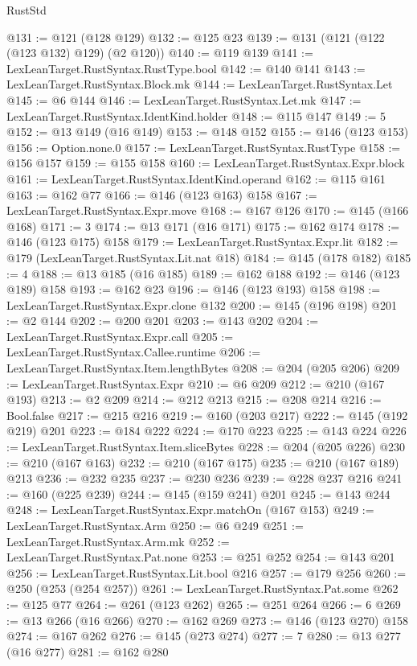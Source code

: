 \begin{lexlean}{RustStd}
\begin{coremodule}
@131 := @121 (@128 @129)
@132 := @125 @23
@139 := @131 (@121 (@122 (@123 @132) @129) (@2 @120))
@140 := @119 @139
@141 := LexLeanTarget.RustSyntax.RustType.bool
@142 := @140 @141
@143 := LexLeanTarget.RustSyntax.Block.mk
@144 := LexLeanTarget.RustSyntax.Let
@145 := @6 @144
@146 := LexLeanTarget.RustSyntax.Let.mk
@147 := LexLeanTarget.RustSyntax.IdentKind.holder
@148 := @115 @147
@149 := 5
@152 := @13 @149 (@16 @149)
@153 := @148 @152
@155 := @146 (@123 @153)
@156 := Option.none.{0}
@157 := LexLeanTarget.RustSyntax.RustType
@158 := @156 @157
@159 := @155 @158
@160 := LexLeanTarget.RustSyntax.Expr.block
@161 := LexLeanTarget.RustSyntax.IdentKind.operand
@162 := @115 @161
@163 := @162 @77
@166 := @146 (@123 @163) @158
@167 := LexLeanTarget.RustSyntax.Expr.move
@168 := @167 @126
@170 := @145 (@166 @168)
@171 := 3
@174 := @13 @171 (@16 @171)
@175 := @162 @174
@178 := @146 (@123 @175) @158
@179 := LexLeanTarget.RustSyntax.Expr.lit
@182 := @179 (LexLeanTarget.RustSyntax.Lit.nat @18)
@184 := @145 (@178 @182)
@185 := 4
@188 := @13 @185 (@16 @185)
@189 := @162 @188
@192 := @146 (@123 @189) @158
@193 := @162 @23
@196 := @146 (@123 @193) @158
@198 := LexLeanTarget.RustSyntax.Expr.clone @132
@200 := @145 (@196 @198)
@201 := @2 @144
@202 := @200 @201
@203 := @143 @202
@204 := LexLeanTarget.RustSyntax.Expr.call
@205 := LexLeanTarget.RustSyntax.Callee.runtime
@206 := LexLeanTarget.RustSyntax.Item.lengthBytes
@208 := @204 (@205 @206)
@209 := LexLeanTarget.RustSyntax.Expr
@210 := @6 @209
@212 := @210 (@167 @193)
@213 := @2 @209
@214 := @212 @213
@215 := @208 @214
@216 := Bool.false
@217 := @215 @216
@219 := @160 (@203 @217)
@222 := @145 (@192 @219) @201
@223 := @184 @222
@224 := @170 @223
@225 := @143 @224
@226 := LexLeanTarget.RustSyntax.Item.sliceBytes
@228 := @204 (@205 @226)
@230 := @210 (@167 @163)
@232 := @210 (@167 @175)
@235 := @210 (@167 @189) @213
@236 := @232 @235
@237 := @230 @236
@239 := @228 @237 @216
@241 := @160 (@225 @239)
@244 := @145 (@159 @241) @201
@245 := @143 @244
@248 := LexLeanTarget.RustSyntax.Expr.matchOn (@167 @153)
@249 := LexLeanTarget.RustSyntax.Arm
@250 := @6 @249
@251 := LexLeanTarget.RustSyntax.Arm.mk
@252 := LexLeanTarget.RustSyntax.Pat.none
@253 := @251 @252
@254 := @143 @201
@256 := LexLeanTarget.RustSyntax.Lit.bool @216
@257 := @179 @256
@260 := @250 (@253 (@254 @257))
@261 := LexLeanTarget.RustSyntax.Pat.some
@262 := @125 @77
@264 := @261 (@123 @262)
@265 := @251 @264
@266 := 6
@269 := @13 @266 (@16 @266)
@270 := @162 @269
@273 := @146 (@123 @270) @158
@274 := @167 @262
@276 := @145 (@273 @274)
@277 := 7
@280 := @13 @277 (@16 @277)
@281 := @162 @280

\end{coremodule}
\end{lexlean}

